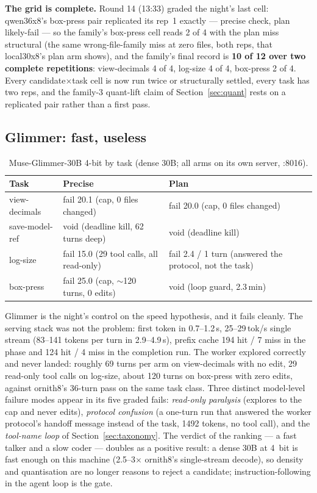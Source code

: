 \textbf{The grid is complete.} Round 14 (13:33) graded the night's last cell: qwen36x8's box-press pair
replicated its rep~1 exactly --- precise check, plan likely-fail --- so the family's box-press cell reads 2 of
4 with the plan miss structural (the same wrong-file-family miss at zero files, both reps, that local30x8's
plan arm shows), and the family's final record is \textbf{10 of 12 over two complete repetitions}:
view-decimals 4 of 4, log-size 4 of 4, box-press 2 of 4. Every candidate$\times$task cell is now run twice or
structurally settled, every task has two reps, and the family-3 quant-lift claim of
Section~\ref{sec:quant} rests on a replicated pair rather than a first pass.

\subsection{Glimmer: fast, useless}\label{sec:glimmer}

\begin{table}[htbp]
\centering
\small
\caption{Muse-Glimmer-30B 4-bit by task (dense 30B; all arms on its own server, :8016).}\label{tab:glimmer}
\begin{tabular}{P{2.6cm}P{5.7cm}P{5.7cm}}
\toprule
Task & Precise & Plan \\
\midrule
view-decimals & fail 20.1 (cap, 0 files changed) & fail 20.0 (cap, 0 files changed) \\
save-model-ref & void (deadline kill, 62 turns deep) & void (deadline kill) \\
log-size & fail 15.0 (29 tool calls, all read-only) & fail 2.4 / 1 turn (answered the protocol, not the task) \\
box-press & fail 25.0 (cap, ${\sim}$120 turns, 0 edits) & void (loop guard, 2.3\,min) \\
\bottomrule
\end{tabular}
\end{table}

Glimmer is the night's control on the speed hypothesis, and it fails cleanly. The serving stack was not the
problem: first token in 0.7--1.2\,s, 25--29\,tok/s single stream (83--141 tokens per turn in 2.9--4.9\,s), prefix
cache 194 hit / 7 miss in the phase and 124 hit / 4 miss in the completion run. The worker explored correctly and
never landed: roughly 69 turns per arm on view-decimals with no edit, 29 read-only tool calls on log-size, about
120 turns on box-press with zero edits, against ornith8's 36-turn pass on the same task class. Three distinct
model-level failure modes appear in its five graded fails: \emph{read-only paralysis} (explores to the cap and
never edits), \emph{protocol confusion} (a one-turn run that answered the worker protocol's handoff message
instead of the task, 1492 tokens, no tool call), and the \emph{tool-name loop} of
Section~\ref{sec:taxonomy}. The verdict of the ranking --- a fast talker and a slow coder --- doubles as a
positive result: a dense 30B at 4~bit is fast enough on this machine (2.5--3$\times$ ornith8's single-stream
decode), so density and quantisation are no longer reasons to reject a candidate; instruction-following in the
agent loop is the gate.

